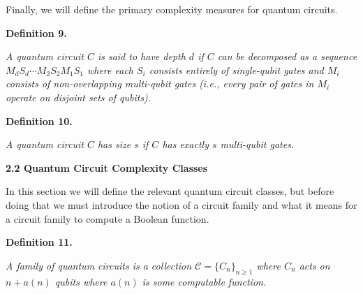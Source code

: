 \documentclass[10pt,a4paper]{article}
\begin{document}
Finally, we will define the primary complexity measures for quantum circuits.\par





\par\medskip\noindent\textbf{
\textbf{Definition 9}\textbf{.}
}\par



\emph{A quantum circuit $C$ is said to have depth $d$ if $C$ can be decomposed as a sequence $M_{d}S_{d}\cdots M_{2}S_{2}M_{1}S_{1}$ where each $S_{i}$ consists entirely of single-qubit gates and $M_{i}$ consists of non-overlapping multi-qubit gates (i.e., every pair of gates in $M_{i}$ operate on disjoint sets of qubits).}\par







\par\medskip\noindent\textbf{
\textbf{Definition 10}\textbf{.}
}\par



\emph{A quantum circuit $C$ has size $s$ if $C$ has exactly $s$ multi-qubit gates.}\par







\par\medskip\noindent\textbf{
2.2 Quantum Circuit Complexity Classes}\par




In this section we will define the relevant quantum circuit classes, but before doing that we must introduce the notion of a circuit family and what it means for a circuit family to compute a Boolean function.\par





\par\medskip\noindent\textbf{
\textbf{Definition 11}\textbf{.}
}\par



\emph{A family of quantum circuits is a collection $\mathcal{C}=\{C_{n}\}_{n\geq 1}$ where $C_{n}$ acts on $n+a(n)$ qubits where $a(n)$ is some computable function.}\par
\end{document}
